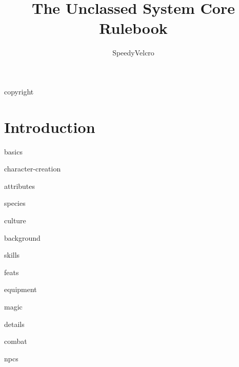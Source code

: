 \documentclass[8pt]{extbook}
\title{The Unclassed System Core Rulebook}
\author{SpeedyVelcro}
\date{\unclassedversion} %
\begin{document}
\maketitle

\frontmatter

{copyright}

\tableofcontents

\mainmatter
\chapter{Introduction}

{basics}

{character-creation}

{attributes}

{species}

{culture}

{background}

{skills}

{feats}

{equipment}

{magic}

{details}

{combat}

{npcs}


\backmatter

\printindex

\glsaddallunused
\printglossary[type=\acronymtype]
\printglossary
\end{document}
